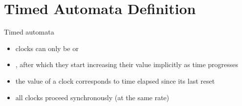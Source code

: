 \documentclass[aspectratio=169]{beamer}
\begin{document}
\section{Timed Automata Definition} %

\begin{slide}{Timed automata}
\small


\begin{itemize}
\item clocks can only be  or
\item {}, after which they start increasing their value implicitly as time progresses
\item the value of a clock corresponds to time elapsed since its last reset 
\item all clocks proceed synchronously (at the same rate)
\end{itemize}

\end{slide}
\end{document}
